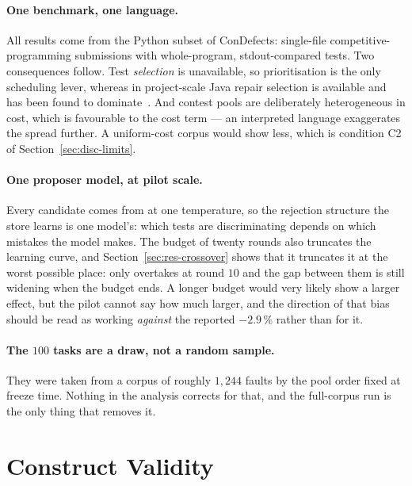 \paragraph{One benchmark, one language.} All results come from the Python
subset of ConDefects: single-file competitive-programming submissions with
whole-program, stdout-compared tests. Two consequences follow. Test
\emph{selection} is unavailable, so prioritisation is the only scheduling
lever, whereas in project-scale Java repair selection is available and has been
found to dominate~\citep{lou2024aprregression}. And contest pools are
deliberately heterogeneous in cost, which is favourable to the cost term --- an
interpreted language exaggerates the spread further. A uniform-cost corpus
would show less, which is condition C2 of Section~\ref{sec:disc-limits}.

\paragraph{One proposer model, at pilot scale.} Every candidate comes from
 at one temperature, so the
rejection structure the store learns is one model's: which tests are
discriminating depends on which mistakes the model makes. The budget of twenty
rounds also truncates the learning curve, and
Section~\ref{sec:res-crossover} shows that it truncates it at the worst
possible place:  only overtakes  at round $10$ and the
gap between them is still widening when the budget ends. A longer budget would
very likely show a larger effect, but the pilot cannot say how much larger,
and the direction of that bias should be read as working \emph{against} the
reported $-2.9\,\%$ rather than for it.

\paragraph{The $100$ tasks are a draw, not a random sample.} They were taken
from a corpus of roughly $1{,}244$ faults by the pool order fixed at freeze
time. Nothing in the analysis corrects for that, and the full-corpus run is the
only thing that removes it.

\section{Construct Validity}

